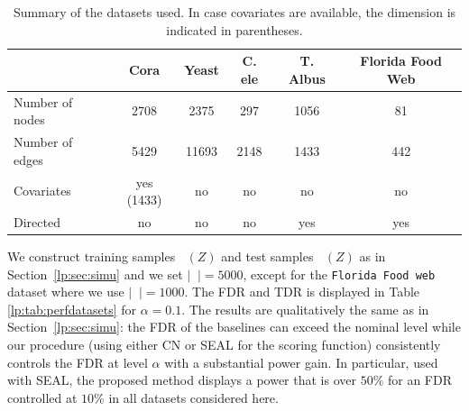 \documentclass[a4paper, 11pt]{article}
\theoremstyle{remark}
\DeclareMathOperator{\Dtr}{\cD_{\text{train}}}
\DeclareMathOperator{\Dcal}{\cD_{\text{cal}}}
\DeclareMathOperator{\Dtest}{\cD_{\text{test}}}
\newcommand{\EM}{\ensuremath}
\newcommand{\cD}{\EM{\mathcal{D}}}
\begin{document}
\begin{table}
\caption{Summary of the datasets used. In case covariates are available, the dimension is indicated in parentheses.}
\centering
 \begin{tabular}{lccccc}
& Cora  & Yeast & C. ele & T. Albus & Florida Food Web \\
\hline
Number of nodes & 2708  &  2375 & 297  & 1056 & 81   \\
Number of edges & 5429 & 11693  & 2148 & 1433  & 442 \\
Covariates & yes (1433) & no  & no & no & no \\
Directed & no & no & no & yes & yes\\
\hline
\end{tabular}

\end{table} \label{lp:tab:datasets}

We construct training samples $\Dtr(Z)$ and test samples $\Dtest(Z)$ as in Section \ref{lp:sec:simu} and we set $\vert \Dcal \vert = 5000$, except for the \texttt{Florida Food web} dataset where we use $\vert \Dcal \vert = 1000$. The FDR and TDR is displayed in Table \ref{lp:tab:perfdatasets} for $\alpha=0.1$.  The results are qualitatively the same as in Section \ref{lp:sec:simu}: the FDR of the baselines can exceed the nominal level while our procedure (using either CN or SEAL for the scoring function) consistently controls the FDR at level $\alpha$ with a substantial power gain. In particular, used with SEAL, the proposed method displays a power that is over $50\%$ for an FDR controlled at $10\%$ in all datasets considered here. 
\end{document}

